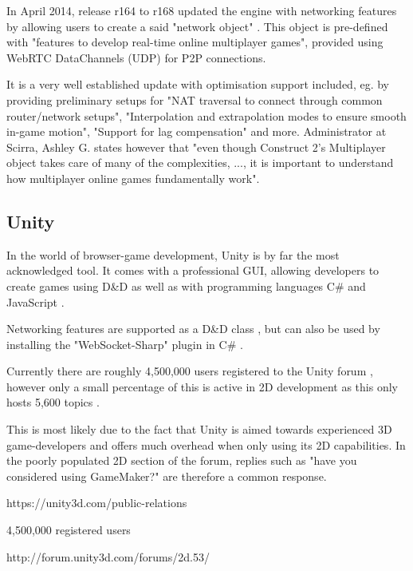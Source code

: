 \documentclass[bsc,frontabs,twoside,singlespacing,parskip,deptreport]{infthesis}     %
\begin{document}
In April 2014, release r164 to r168 updated the engine with networking features by allowing users to create a said "network object" \cite{construct2_multiplayer}. This object is pre-defined with "features to develop real-time online multiplayer games", provided using WebRTC DataChannels (UDP) for P2P connections. 

It is a very well established update with optimisation support included, eg. by providing preliminary setups for "NAT traversal to connect through common router/network setups", "Interpolation and extrapolation modes to ensure smooth in-game motion", "Support for lag compensation" and more. Administrator at Scirra, Ashley G. states however that "even though Construct 2's Multiplayer object takes care of many of the complexities, ..., it is important to understand how multiplayer online games fundamentally work"\cite{Construct2_Multiplayer_Tutorial}.


\subsection{Unity}
In the world of browser-game development, Unity is by far the most acknowledged tool. It comes with a professional GUI, allowing developers to create games using D\&D as well as with programming languages C\# and JavaScript \cite{unity_support}.

Networking features are supported as a D\&D class \cite{unity_networking}, but can also be used by installing the "WebSocket-Sharp" plugin in C\# \cite{unity_websocket_sharp}.

Currently there are roughly 4,500,000 users registered to the Unity forum \cite{unity_forum}, however only a small percentage of this is active in 2D development as this only hosts 5,600 topics \cite{unity_forum_2d}. 

This is most likely due to the fact that Unity is aimed towards experienced 3D game-developers and offers much overhead when only using its 2D capabilities. In the poorly populated 2D section of the forum, replies such as "have you considered using GameMaker?" \cite{unity_suggests_gamemaker} are therefore a common response.

https://unity3d.com/public-relations

4,500,000 registered users

http://forum.unity3d.com/forums/2d.53/
\end{document}
